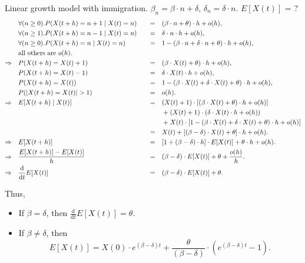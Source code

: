 \begin{question}
Linear growth model with immigration. $ \beta_{n} = \beta \cdot n + \delta $, $ \delta_{n} = \delta \cdot n $. $ E[X(t)] $ = ?
\begin{alignat*}{3}
  & \forall (n \ge 0). P(X(t + h) = n + 1 \mid X(t) = n)
    & \quad=\quad & (\beta \cdot n + \theta) \cdot h + o(h), \\
  & \forall (n \ge 1). P(X(t + h) = n - 1 \mid X(t) = n)
    & \quad=\quad & \delta \cdot n \cdot h + o(h), \\
  & \forall (n \ge 0). P(X(t + h) = n \mid X(t) = n)
    & \quad=\quad & 1 - (\beta \cdot n + \delta \cdot n + \theta) \cdot h + o(h), \\
  & \text{all others are $ o(h) $.} \\
\Rightarrow\quad
  & P(X(t + h) = X(t) + 1)
    & \quad=\quad & (\beta \cdot X(t) + \theta) \cdot h + o(h), \\
  & P(X(t + h) = X(t) - 1)
    & \quad=\quad & \delta \cdot X(t) \cdot h + o(h), \\
  & P(X(t + h) = X(t))
    & \quad=\quad & 1 - (\beta \cdot X(t) + \delta \cdot X(t) + \theta) \cdot h + o(h), \\
  & P(|X(t + h) = X(t)| > 1)
    & \quad=\quad & o(h). \\
\Rightarrow\quad
  & E[X(t + h) \mid X(t)]
    & \quad=\quad & (X(t) + 1) \cdot [(\beta \cdot X(t) + \theta) \cdot h + o(h)] \\
  & & & + (X(t) + 1) \cdot (\delta \cdot X(t) \cdot h + o(h)) \\
  & & & + X(t) \cdot [1 - (\beta \cdot X(t) + \delta \cdot X(t) + \theta) \cdot h + o(h)] \\
  & & \quad=\quad & X(t) + [(\beta - \delta) \cdot X(t) + \theta] \cdot h + o(h). \\
\Rightarrow\quad
  & E[X(t + h)]
    & \quad=\quad & [1 + (\beta - \delta) \cdot h] \cdot E[X(t)] + \theta \cdot h + o(h). \\
\Rightarrow\quad
  & \frac{E[X(t + h)] - E[X(t)]}{h}
    & \quad=\quad & (\beta - \delta) \cdot E[X(t)] + \theta + \frac{o(h)}{h}. \\
\Rightarrow\quad
  & \frac{\mathrm{d}}{\mathrm{d}t} E[X(t)]
    & \quad=\quad & (\beta - \delta) \cdot E[X(t)] + \theta. \\
\end{alignat*}

Thus,
\begin{itemize}
\item If $ \beta = \delta $, then $ \frac{\mathrm{d}}{\mathrm{d}t} E[X(t)] = \theta $.

\item If $ \beta \neq \delta $, then
\[ E[X(t)] = X(0) \cdot e^{(\beta - \delta)t} + \frac{\theta}{(\beta - \delta)} \cdot (e^{(\beta - \delta)t} - 1). \]
\end{itemize}

\begin{comment}
If $ \beta < \delta $,
\[ \lim_{t \to \infty} E[X(t)] = \frac{\theta}{\delta - \beta} > 0. \]
\end{comment}
\end{question}

